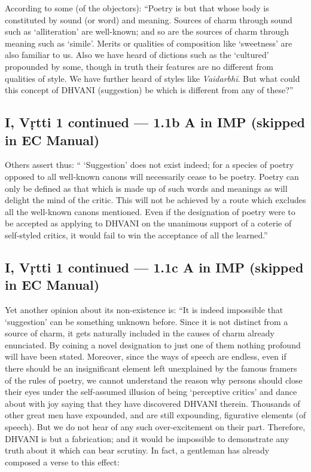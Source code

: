 \documentclass[12pt]{book}
\begin{document}
According to some (of the objectors): ``Poetry is but
that whose body is constituted by sound (or word) and meaning.
Sources of charm through sound such as `alliteration' are well-known; and so are the sources of charm through meaning such
as `simile'. Merits or qualities of composition like `sweetness'
are also familiar to us. Also we have heard of dictions such as
the `cultured' propounded by some, though in truth their features
are no different from qualities of style. We have further heard
of styles like \textit{Vaidarbhī}. But what could this concept of DHVANI
(suggestion) be which is different from any of these?”


\subsection{I, Vṛtti 1 continued --- 1.1b A in IMP (skipped in EC Manual)}

Others assert thus: `` `Suggestion' does not exist indeed;
for a species of poetry opposed to all well-known canons will
necessarily cease to be poetry. Poetry can only be defined as
that which is made up of such words and meanings as will delight
the mind of the critic. This will not be achieved by a route which
excludes all the well-known canons mentioned. Even if the
designation of poetry were to be accepted as applying to DHVANI on
the unanimous support of a coterie of self-styled critics, it would
fail to win the acceptance of all the learned.''


\subsection{I, Vṛtti 1 continued --- 1.1c A in IMP (skipped in EC Manual)}

Yet another opinion about its non-existence is: ``It is
indeed impossible that `suggestion' can be something unknown
before. Since it is not distinct from a source of charm, it gets
naturally included in the causes of charm already enunciated.
By coining a novel designation to just one of them nothing
profound will have been stated. Moreover, since the ways
of speech are endless, even if there should be an insignificant
element left unexplained by the famous framers of the rules of
poetry, we cannot understand the reason why persons should
close their eyes under the self-assumed illusion of being `perceptive
critics' and dance about with joy saying that they have discovered DHVANI therein. Thousands of other great men
have expounded, and are still expounding, figurative elements
(of speech). But we do not hear of any such over-excitement
on their part. Therefore, DHVANI is but a fabrication; and it
would be impossible to demonstrate any truth about it which can
bear scrutiny. In fact, a gentleman has already composed a
verse to this effect:
\end{document}
